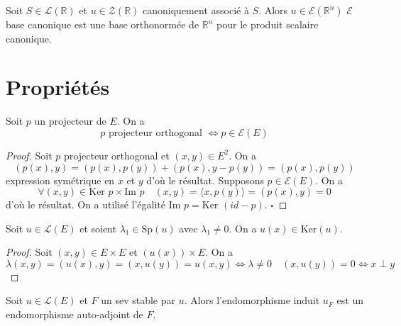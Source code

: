 \begin{remark}

Soit $S \in \mathcal{L}(\mathbb{R})$ et $u \in \mathcal{Z}(\mathbb{R})$ canoniquement associé à $S$. Alors $u \in \mathcal{E}(\mathbb{R}^n)$
$\mathcal{E}$ base canonique est une base orthonormée de $\mathbb{R}^n$ pour le produit scalaire canonique.

\end{remark}

\section{Propriétés}

\begin{proposition}
\label{prop:26}

Soit $p$ un projecteur de $E$. On a
\[ p \text{ projecteur orthogonal } \iff p \in \mathcal{E}(E) \]
\end{proposition}

\begin{proof}

Soit $p$ projecteur orthogonal et $(x,y) \in E^2$. On a
\[ (p(x), y) = (p(x), p(y)) + (p(x), y - p(y)) = (p(x), p(y)) \]
expression symétrique en $x$ et $y$ d'où le résultat. Supposons $p \in \mathcal{E}(E)$. On a
\[ \forall (x,y) \in \text{Ker } p \times \text{Im } p \quad (x,y) = \langle x, p(y) \rangle = (p(x), y) = 0 \]
d'où le résultat. On a utilisé l'égalité $\text{Im } p = \text{Ker } (id - p)$. $\square$

\end{proof}

\begin{proposition}
\label{prop:27}

Soit $u \in \mathcal{L}(E)$ et soient $\lambda_1 \in \text{Sp}(u)$ avec $\lambda_1 \neq 0$. On a $u(x) \in \text{Ker}(u)$.
\end{proposition}

\begin{proof}

Soit $(x,y) \in E \times E$ et $(u(x)) \times E$. On a
\[ \lambda (x,y) = (u(x), y) = (x, u(y)) = u(x,y) \iff \lambda \neq 0 \quad (x, u(y)) = 0 \iff x \perp y \]

\end{proof}

\begin{proposition}
\label{prop:28}

Soit $u \in \mathcal{L}(E)$ et $F$ un sev stable par $u$. Alors l'endomorphisme induit $u_F$ est un endomorphisme auto-adjoint de $F$.
\end{proposition}

